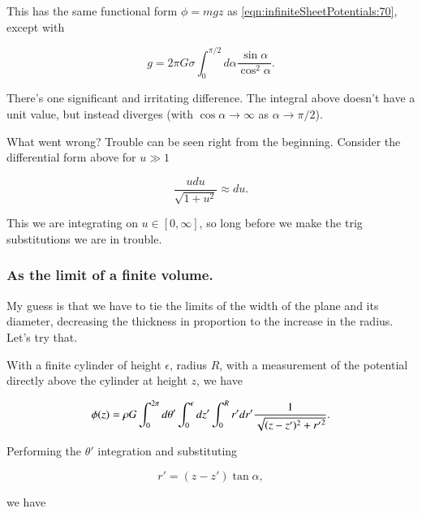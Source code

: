 This has the same functional form $\phi = m g z$ as \ref{eqn:infiniteSheetPotentials:70}, except with

\begin{equation}\label{eqn:infiniteSheetPotentials:190}
g = 2 \pi G \sigma \int_0^{\pi/2} d\alpha \frac{\sin \alpha}{\cos^2 \alpha}.
\end{equation}

There's one significant and irritating difference.  The integral above doesn't have a unit value, but instead diverges (with $\cos\alpha \rightarrow \infty$ as $\alpha \rightarrow \pi/2$).

What went wrong?  Trouble can be seen right from the beginning.  Consider the differential form above for $u \gg 1$

\begin{equation}\label{eqn:infiniteSheetPotentials:210}
\frac{u du}{\sqrt{1 + u^2}} \approx du.
\end{equation}

This we are integrating on $u \in [0, \infty]$, so long before we make the trig substitutions we are in trouble.  

\subsubsection{As the limit of a finite volume.}

My guess is that we have to tie the limits of the width of the plane and its diameter, decreasing the thickness in proportion to the increase in the radius.  Let's try that.

With a finite cylinder of height $\epsilon$, radius $R$, with a measurement of the potential directly above the cylinder at height $z$, we have

\begin{equation}\label{eqn:infiniteSheetPotentials:230}
\phi(z) 
= \rho G \int_0^{2\pi} d\theta' \int_0^\epsilon dz' \int_0^R r' dr' \frac{1}{\sqrt{(z-z')^2 + {r'}^2}}.
\end{equation}

Performing the $\theta'$ integration and substituting

\begin{equation}\label{eqn:infiniteSheetPotentials:250}
r' = (z - z') \tan\alpha,
\end{equation}

we have

